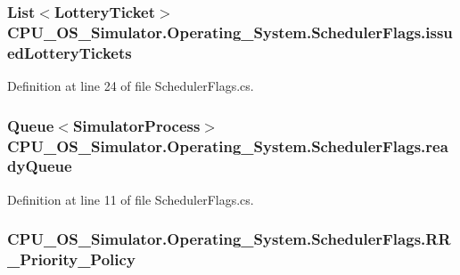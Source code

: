 \subsubsection[{issued\+Lottery\+Tickets}]{\setlength{\rightskip}{0pt plus 5cm}List$<${\bf Lottery\+Ticket}$>$ C\+P\+U\+\_\+\+O\+S\+\_\+\+Simulator.\+Operating\+\_\+\+System.\+Scheduler\+Flags.\+issued\+Lottery\+Tickets}\label{struct_c_p_u___o_s___simulator_1_1_operating___system_1_1_scheduler_flags_afb4de8c16fd93a7e44acddfa4c2484f2}


Definition at line 24 of file Scheduler\+Flags.\+cs.

\hypertarget{struct_c_p_u___o_s___simulator_1_1_operating___system_1_1_scheduler_flags_a6345abea6614091648d1529683ec02f4}{}
\subsubsection[{ready\+Queue}]{\setlength{\rightskip}{0pt plus 5cm}Queue$<${\bf Simulator\+Process}$>$ C\+P\+U\+\_\+\+O\+S\+\_\+\+Simulator.\+Operating\+\_\+\+System.\+Scheduler\+Flags.\+ready\+Queue}\label{struct_c_p_u___o_s___simulator_1_1_operating___system_1_1_scheduler_flags_a6345abea6614091648d1529683ec02f4}


Definition at line 11 of file Scheduler\+Flags.\+cs.

\hypertarget{struct_c_p_u___o_s___simulator_1_1_operating___system_1_1_scheduler_flags_a293340444e5a9fdb921a9f1dbcef3428}{}
\subsubsection[{R\+R\+\_\+\+Priority\+\_\+\+Policy}]{ C\+P\+U\+\_\+\+O\+S\+\_\+\+Simulator.\+Operating\+\_\+\+System.\+Scheduler\+Flags.\+R\+R\+\_\+\+Priority\+\_\+\+Policy}\label{struct_c_p_u___o_s___simulator_1_1_operating___system_1_1_scheduler_flags_a293340444e5a9fdb921a9f1dbcef3428}


